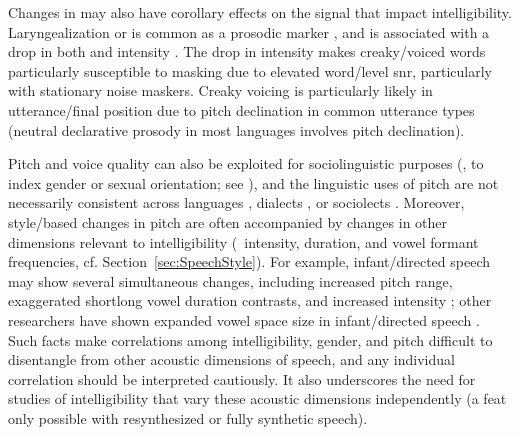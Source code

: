 Changes in \fo{} may also have corollary effects on the signal that impact intelligibility.  Laryngealization or  is common as a prosodic marker \citep{Lehiste1979, Kreiman1982, DilleyEtAl1996}, and is associated with a drop in both \fo{} and intensity \citep{GordonLadefoged2001}.  The drop in intensity makes creaky\-/voiced words particularly susceptible to masking due to elevated word\-/level \ac{snr}, particularly with stationary noise maskers.  Creaky voicing is particularly likely in utterance\-/final position due to pitch declination in common utterance types (neutral declarative prosody in most languages involves pitch declination).

Pitch and voice quality can also be exploited for sociolinguistic purposes (\eg, to index gender or sexual orientation; see \citealt[\intal]{McconnellGinet1978, Gaudio1994, Podesva2011}), and the linguistic uses of pitch are not necessarily consistent across languages \citep{MajewskiEtAl1972, Todaka1993, Yuasa2008, KeatingKuo2012}, dialects \citep{GrabePost2002, ClopperSmiljanic2011}, or sociolects \citep{McLemore1991, Britain2008}.  %
Moreover, style\-/based changes in pitch are often accompanied by changes in other dimensions relevant to intelligibility (\viz\ intensity, duration, and vowel formant frequencies, cf. Section~\ref{sec:SpeechStyle}).  For example, infant\-/directed speech may show several simultaneous changes, including increased pitch range, exaggerated short\slsh long vowel duration contrasts, and increased intensity \citep{WassinkEtAl2007}; other researchers have shown expanded vowel space size in infant\-/directed speech \citep{KuhlEtAl1997}.  Such facts make correlations among intelligibility, gender, and pitch difficult to disentangle from other acoustic dimensions of speech, and any individual correlation should be interpreted cautiously.  It also underscores the need for studies of intelligibility that vary these acoustic dimensions independently (a feat only possible with resynthesized or fully synthetic speech).

